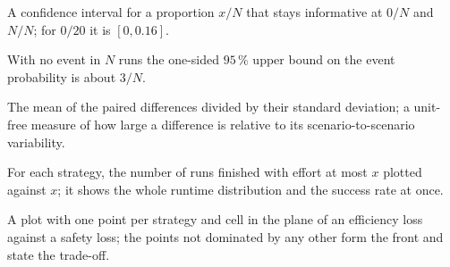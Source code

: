 \item[Wilson interval] A confidence interval for a proportion $x/N$ that stays informative at $0/N$ and $N/N$; for $0/20$ it is $[0, 0.16]$.
\item[Rule of three] With no event in $N$ runs the one-sided $95\,\%$ upper bound on the event probability is about $3/N$.
\item[Effect size $d_z$] The mean of the paired differences divided by their standard deviation; a unit-free measure of how large a difference is relative to its scenario-to-scenario variability.
\item[Cactus plot] For each strategy, the number of runs finished with effort at most $x$ plotted against $x$; it shows the whole runtime distribution and the success rate at once.
\item[Pareto plot] A plot with one point per strategy and cell in the plane of an efficiency loss against a safety loss; the points not dominated by any other form the front and state the trade-off.
